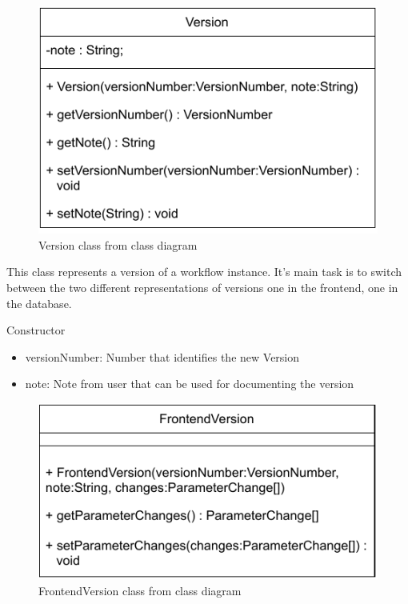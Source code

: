 

\begin{figure}[h]
\centerline{\includegraphics[scale=1]{res/Klassen/Version.pdf}}
\caption{Version class from class diagram}
\end{figure}

This class represents a version of a workflow instance. It's main task is to switch between the two different representations of versions one in the frontend, one in the database.
\begin{methodenv}{Constructor}



\begin{itemize}
	\item{versionNumber:}
	Number that identifies the new Version
	\item{note:}
	Note from user that can be used for documenting the version
\end{itemize}
\end{methodenv}

\begin{figure}[h]
\centerline{\includegraphics[scale=1]{res/Klassen/FrontendVersion.pdf}}
\caption{FrontendVersion class from class diagram}
\end{figure}

